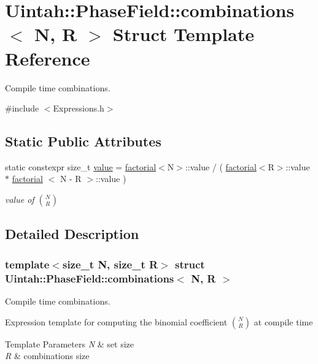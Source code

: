 \hypertarget{structUintah_1_1PhaseField_1_1combinations}{}\section{Uintah\+:\+:Phase\+Field\+:\+:combinations$<$ N, R $>$ Struct Template Reference}
\label{structUintah_1_1PhaseField_1_1combinations}


Compile time combinations.  




{\ttfamily \#include $<$Expressions.\+h$>$}

\subsection*{Static Public Attributes}
\begin{DoxyCompactItemize}
\item 
static constexpr size\+\_\+t \hyperlink{structUintah_1_1PhaseField_1_1combinations_af4ee057e220b323e71a7bfb2107af0a1}{value} = \hyperlink{structUintah_1_1PhaseField_1_1factorial}{factorial}$<$N$>$\+::value / ( \hyperlink{structUintah_1_1PhaseField_1_1factorial}{factorial}$<$R$>$\+::value $\ast$ \hyperlink{structUintah_1_1PhaseField_1_1factorial}{factorial} $<$ N -\/ R $>$\+::value )
\begin{DoxyCompactList}\small\item\em value of $ N\choose R $ \end{DoxyCompactList}\end{DoxyCompactItemize}


\subsection{Detailed Description}
\subsubsection*{template$<$size\+\_\+t N, size\+\_\+t R$>$\newline
struct Uintah\+::\+Phase\+Field\+::combinations$<$ N, R $>$}

Compile time combinations. 

Expression template for computing the binomial coefficient $ N\choose R $ at compile time 
\begin{DoxyTemplParams}{Template Parameters}
{\em N} & set size \\
\hline
{\em R} & combinations size \\
\hline
\end{DoxyTemplParams}


